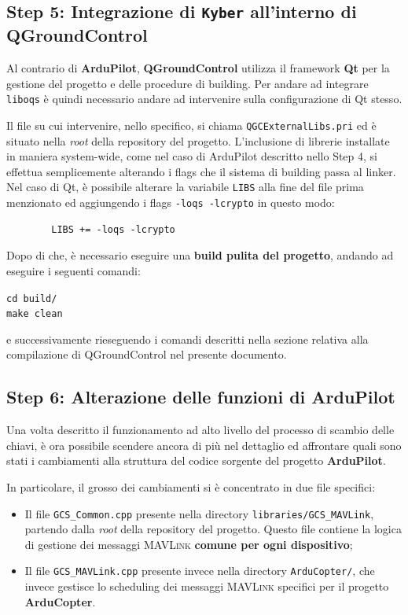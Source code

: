 \documentclass[a4paper, 12pt, oneside]{article}
\theoremstyle{definition}
\begin{document}
\newpage
\subsection{Step 5: Integrazione di \texttt{Kyber} all'interno di QGroundControl}

Al contrario di \textbf{ArduPilot}, \textbf{QGroundControl} utilizza il framework \textbf{Qt} per la gestione del progetto e delle procedure di building. Per andare ad integrare \texttt{liboqs} è quindi necessario andare ad intervenire sulla configurazione di Qt stesso. 

Il file su cui intervenire, nello specifico, si chiama \texttt{QGCExternalLibs.pri} ed è situato nella \textit{root} della repository del progetto. L'inclusione di librerie installate in maniera system-wide, come nel caso di ArduPilot descritto nello Step 4, si effettua semplicemente alterando i flags che il sistema di building passa al linker. Nel caso di Qt, è possibile alterare la variabile \texttt{LIBS} alla fine del file prima menzionato ed aggiungendo i flags \texttt{-loqs -lcrypto} in questo modo:

    \begin{verbatim}
        LIBS += -loqs -lcrypto
    \end{verbatim}

Dopo di che, è necessario eseguire una \textbf{build pulita del progetto}, andando ad eseguire i seguenti comandi:

\begin{center}
    \texttt{cd build/} \\
    \texttt{make clean}
\end{center}

e successivamente rieseguendo i comandi descritti nella sezione relativa alla compilazione di QGroundControl nel presente documento.

\newpage
\subsection{Step 6: Alterazione delle funzioni di \textbf{ArduPilot}}
Una volta descritto il funzionamento ad alto livello del processo di scambio delle chiavi, è ora possibile scendere ancora di più nel dettaglio ed affrontare quali sono stati i cambiamenti alla struttura del codice sorgente del progetto \textbf{ArduPilot}.

In particolare, il grosso dei cambiamenti si è concentrato in due file specifici:

\begin{itemize}
    \item Il file \texttt{GCS\_Common.cpp} presente nella directory \texttt{libraries/GCS\_MAVLink}, partendo dalla \textit{root} della repository del progetto. Questo file contiene la logica di gestione dei messaggi \textsc{MAVLink} \textbf{comune per ogni dispositivo};
    \item Il file \texttt{GCS\_MAVLink.cpp} presente invece nella directory \texttt{ArduCopter/}, che invece gestisce lo scheduling dei messaggi \textsc{MAVLink} specifici per il progetto \textbf{ArduCopter}.
\end{itemize}
\end{document}
